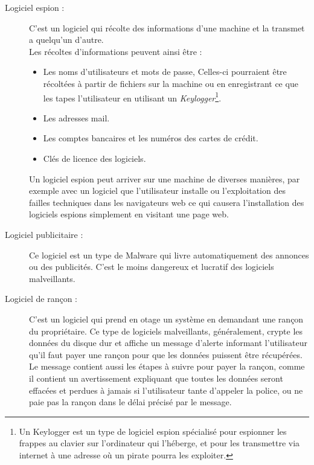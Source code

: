 \begin{description}
        \item[Logiciel espion :] C'est un logiciel qui récolte des informations d’une machine et 
            la transmet a quelqu'un d'autre.\\ %
            Les récoltes d'informations peuvent ainsi être :
            \begin{itemize}
                \item Les noms d’utilisateurs et mots de passe, Celles-ci pourraient être récoltées à partir de
                    fichiers sur la machine ou en enregistrant ce que les tapes l'utilisateur en utilisant 
                    un \emph{Keylogger}\footnote{Un Keylogger est un type de logiciel espion spécialisé pour 
                    espionner les frappes au clavier sur l'ordinateur qui l'héberge, et pour les transmettre 
                    via internet à une adresse où un pirate pourra les exploiter.}.
                \item Les adresses mail.
                \item Les comptes bancaires et les numéros des cartes de crédit.
                \item Clés de licence des logiciels.
            \end{itemize} %
            Un logiciel espion peut arriver sur une machine de diverses manières, par exemple avec un logiciel 
            que l’utilisateur installe ou l’exploitation des failles techniques dans les navigateurs web ce 
            qui causera l’installation des logiciels espions simplement en visitant une page web.\cite{virus}%

        \item[Logiciel publicitaire :] Ce logiciel est un type de Malware qui livre automatiquement des 
            annonces ou des publicités. C’est le moins dangereux et lucratif des logiciels malveillants. %

        \item[Logiciel de rançon :] C’est un logiciel qui prend en otage un système en demandant une rançon 
            du propriétaire. Ce type de logiciels malveillants, généralement, crypte les données du 
            disque dur et affiche un message d’alerte informant l’utilisateur qu’il faut payer une 
            rançon pour que les données puissent être récupérées. Le message contient aussi les étapes à suivre 
            pour payer la rançon, comme il contient un avertissement expliquant que toutes les données 
            seront effacées et perdues à jamais si l’utilisateur tante d'appeler la police, ou ne paie pas la rançon 
            dans le délai précisé par le message. %


\end{description}
